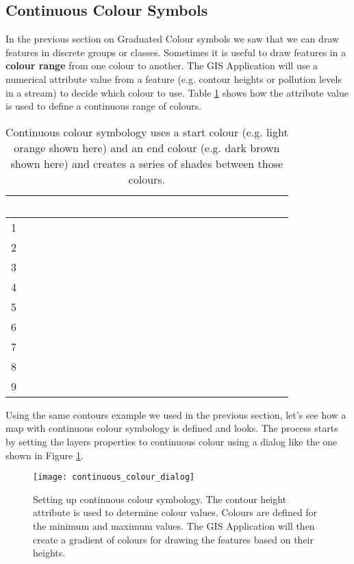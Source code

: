 \subsection{Continuous Colour Symbols}

In the previous section on Graduated Colour symbols we saw that we can draw
features in discrete groups or classes. Sometimes it is useful to draw
features in a \textbf{colour range} from one colour to another. The GIS Application
will use a numerical attribute value from a feature (e.g. contour heights or
pollution levels in a stream) to decide which colour to use. Table
\ref{tab:contcolor} shows how the attribute value is used to define a
continuous range of colours.

\begin{table}[ht]
\centering
\caption{Continuous colour symbology uses a start colour (e.g. light orange
shown here) and an end colour (e.g. dark brown shown here) and creates a
series of shades between those colours.}\medskip
 \label{tab:contcolor}
 \begin{tabular}{|p{8cm}|p{8cm}|}
 \hline
 \rowcolor{black}
 \textcolor{white}{\textbf{Attribute Value}} &
 \textcolor{white}{\textbf{Colour (no classes or grouping)}} \\
 \hline 1 &  \\
 \hline 2 &  \\
 \hline 3 &  \\
 \hline 4 &  \\
 \hline 5 &  \\
 \hline 6 &  \\
 \hline 7 &  \\
 \hline 8 &  \\
 \hline 9 &  \\
\hline
\end{tabular}
\end{table}

Using the same contours example we used in the previous section, let's see
how a map with continuous colour symbology is defined and looks. The process
starts by setting the layers properties to continuous colour using a dialog
like the one shown in Figure \ref{fig:contcoldialog}.

\begin{figure}[ht]
   \begin{center}
   \caption{Setting up continuous colour symbology. The contour height
attribute is used to determine colour values. Colours are defined for the
minimum and maximum values. The GIS Application will then create a gradient
of colours for drawing the features based on their heights.}
\label{fig:contcoldialog}\smallskip
   \texttt{[image: continuous\_colour\_dialog]}
\end{center}
\end{figure}


